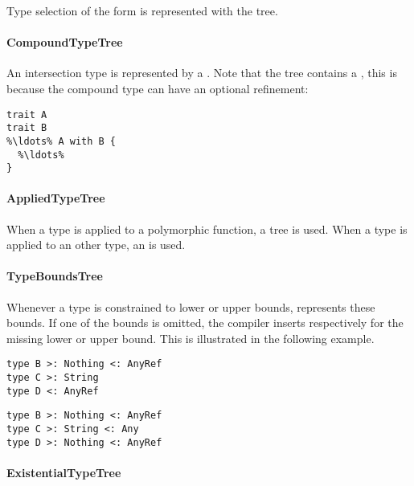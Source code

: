 \noindent Type selection of the form  is represented with the  tree.

\paragraph{CompoundTypeTree} 

\noindent An intersection type is represented by a . Note that the tree contains a , this is because the compound type can have an optional refinement: 

\begin{lstlisting}
trait A
trait B
%\ldots% A with B {
  %\ldots%
}
\end{lstlisting}

\paragraph{AppliedTypeTree} 

\noindent When a type is applied to a polymorphic function, a  tree is used. When a type is applied to an other type, an  is used.

\paragraph{TypeBoundsTree} 

\noindent Whenever a type is constrained to lower or upper bounds,  represents these bounds. If one of the bounds is omitted, the compiler inserts  respectively  for the missing lower or upper bound. This is illustrated in the following example.

\begin{multicols}{2}
\begin{lstlisting}
type B >: Nothing <: AnyRef
type C >: String
type D <: AnyRef
\end{lstlisting}
\begin{lstlisting}  
type B >: Nothing <: AnyRef
type C >: String <: Any
type D >: Nothing <: AnyRef
\end{lstlisting}
\end{multicols}

\paragraph{ExistentialTypeTree} 

